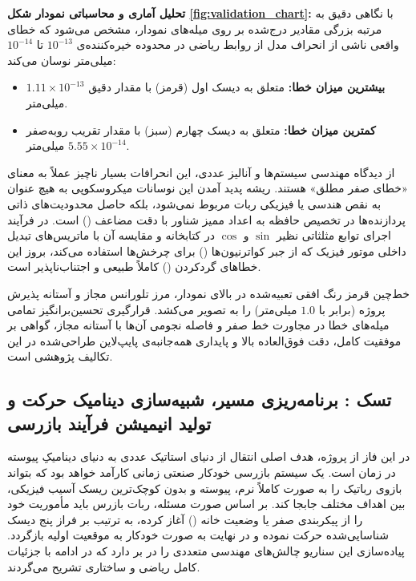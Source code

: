 \documentclass{article}
\begin{document}
\textbf{تحلیل آماری و محاسباتی نمودار شکل \ref{fig:validation_chart}:}
با نگاهی دقیق به مرتبه بزرگی مقادیر درج‌شده بر روی میله‌های نمودار، مشخص می‌شود که خطای واقعی ناشی از انحراف مدل از روابط ریاضی در محدوده خیره‌کننده‌ی $10^{-13}$ تا $10^{-14}$ میلی‌متر نوسان می‌کند:
\begin{itemize}
	\item \textbf{بیشترین میزان خطا:} متعلق به دیسک اول (قرمز) با مقدار دقیق $1.11 \times 10^{-13}$ میلی‌متر.
	\item \textbf{کمترین میزان خطا:} متعلق به دیسک چهارم (سبز) با مقدار تقریب روبه‌صفر $5.55 \times 10^{-14}$ میلی‌متر.
\end{itemize}

از دیدگاه مهندسی سیستم‌ها و آنالیز عددی، این انحرافات بسیار ناچیز عملاً به معنای «خطای صفر مطلق» هستند. ریشه پدید آمدن این نوسانات میکروسکوپی به هیچ عنوان به نقص هندسی یا فیزیکی ربات مربوط نمی‌شود، بلکه حاصل محدودیت‌های ذاتی پردازنده‌ها در تخصیص حافظه به اعداد ممیز شناور با دقت مضاعف () است. در فرآیند اجرای توابع مثلثاتی نظیر $\sin$ و $\cos$ در کتابخانه  و مقایسه آن با ماتریس‌های تبدیل داخلی موتور فیزیک  که از جبر کواترنیون‌ها () برای چرخش‌ها استفاده می‌کند، بروز این خطاهای گردکردن () کاملاً طبیعی و اجتناب‌ناپذیر است.

خط‌چین قرمز رنگ افقی تعبیه‌شده در بالای نمودار، مرز تلورانس مجاز و آستانه پذیرش پروژه (برابر با $1.0$ میلی‌متر) را به تصویر می‌کشد. قرارگیری تحسین‌برانگیز تمامی میله‌های خطا در مجاورت خط صفر و فاصله نجومی آن‌ها با آستانه مجاز، گواهی بر موفقیت کامل، دقت فوق‌العاده بالا و پایداری همه‌جانبه‌ی پایپ‌لاین طراحی‌شده در این تکالیف پژوهشی است.

\subsection{تسک : برنامه‌ریزی مسیر، شبیه‌سازی دینامیک حرکت و تولید انیمیشن فرآیند بازرسی}

در این فاز از پروژه، هدف اصلی انتقال از دنیای استاتیک عددی به دنیای دینامیکِ پیوسته در زمان است. یک سیستم بازرسی خودکار صنعتی زمانی کارآمد خواهد بود که بتواند بازوی رباتیک را به صورت کاملاً نرم، پیوسته و بدون کوچک‌ترین ریسک آسیب فیزیکی، بین اهداف مختلف جابجا کند. بر اساس صورت مسئله، ربات بازرس  باید مأموریت خود را از پیکربندی صفر یا وضعیت خانه () آغاز کرده، به ترتیب بر فراز پنج دیسک شناسایی‌شده حرکت نموده و در نهایت به صورت خودکار به موقعیت اولیه بازگردد. پیاده‌سازی این سناریو چالش‌های مهندسی متعددی را در بر دارد که در ادامه با جزئیات کامل ریاضی و ساختاری تشریح می‌گردند.
\end{document}
